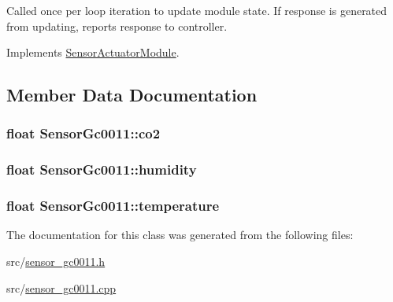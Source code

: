Called once per loop iteration to update module state. If response is generated from updating, reports response to controller. 



Implements \hyperlink{class_sensor_actuator_module_adf93ff40fbdfeecbb8711ea0626fe6fc}{Sensor\+Actuator\+Module}.



\subsection{Member Data Documentation}
\hypertarget{class_sensor_gc0011_acd7c57373be1c5fb21c8da8c25861138}{}
\subsubsection[{co2}]{\setlength{\rightskip}{0pt plus 5cm}float Sensor\+Gc0011\+::co2}\label{class_sensor_gc0011_acd7c57373be1c5fb21c8da8c25861138}
\hypertarget{class_sensor_gc0011_af5964ea62f030dd4ea2f219224afa4e6}{}
\subsubsection[{humidity}]{\setlength{\rightskip}{0pt plus 5cm}float Sensor\+Gc0011\+::humidity}\label{class_sensor_gc0011_af5964ea62f030dd4ea2f219224afa4e6}
\hypertarget{class_sensor_gc0011_a6da77eb384ff77e28c2fa092a03a4cbb}{}
\subsubsection[{temperature}]{\setlength{\rightskip}{0pt plus 5cm}float Sensor\+Gc0011\+::temperature}\label{class_sensor_gc0011_a6da77eb384ff77e28c2fa092a03a4cbb}


The documentation for this class was generated from the following files\+:\begin{DoxyCompactItemize}
\item 
src/\hyperlink{sensor__gc0011_8h}{sensor\+\_\+gc0011.\+h}\item 
src/\hyperlink{sensor__gc0011_8cpp}{sensor\+\_\+gc0011.\+cpp}\end{DoxyCompactItemize}
